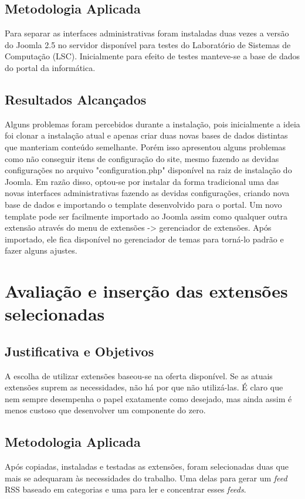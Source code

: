 \subsection{Metodologia Aplicada}

Para separar as interfaces administrativas foram instaladas duas vezes a versão do Joomla 2.5 no servidor disponível para testes do Laboratório de Sistemas de Computação (LSC). Inicialmente para efeito de testes manteve-se a base de dados do portal da informática. 

\subsection{Resultados Alcançados}

Alguns problemas foram percebidos durante a instalação, pois inicialmente a ideia foi clonar a instalação atual e apenas criar duas novas bases de dados distintas que manteriam conteúdo semelhante. Porém isso apresentou alguns problemas como não conseguir itens de configuração do site, mesmo fazendo as devidas configurações no arquivo "configuration.php" disponível na raiz de instalação do Joomla.
Em razão disso, optou-se por instalar da forma tradicional uma das novas interfaces administrativas fazendo as devidas configurações, criando nova base de dados e importando o template desenvolvido para o portal. Um novo template pode ser facilmente importado ao Joomla assim como qualquer outra extensão através do menu de extensões -> gerenciador de extensões. Após importado, ele fica disponível no gerenciador de temas para torná-lo padrão e fazer alguns ajustes.

\section{Avaliação e inserção das extensões selecionadas}
\subsection{Justificativa e Objetivos}

A escolha de utilizar extensões baseou-se na oferta disponível. Se as atuais extensões suprem as necessidades, não há por que não utilizá-las. É claro que nem sempre desempenha o papel exatamente como desejado, mas ainda assim é menos custoso que desenvolver um componente do zero.

\subsection{Metodologia Aplicada}
Após copiadas, instaladas e testadas as extensões, foram selecionadas duas que mais se adequaram às necessidades do trabalho. Uma delas para gerar um \emph{feed} RSS baseado em categorias e uma para ler e concentrar esses \emph{feeds}.

